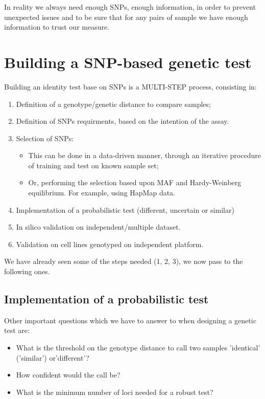 In reality we always need enough SNPs, enough information, in order to prevent unexpected issues and to be sure that for any pairs of sample we have enough information to trust our measure. 


\section{Building a SNP-based genetic test}

Building an identity test base on SNPs is a MULTI-STEP process, consisting in: 
\begin{enumerate}
	\item Definition of a genotype/genetic distance to compare samples;
	\item Definition of SNPs requirments, based on the intention of the assay.
	\item Selection of SNPs:
	\begin{itemize}
		\item This can be done in a data-driven manner, through an iterative procedure of training and test on known sample set;
		\item Or, performing the selection based upon MAF and Hardy-Weinberg equilibrium. For example, using HapMap data.
	\end{itemize}
	\item Implementation of a probabilistic test (different, uncertain or similar)
	\item In silico validation on independent/multiple dataset.
	\item Validation on cell lines genotyped on independent platform. 
\end{enumerate}
We have already seen some of the steps needed (1, 2, 3), we now pass to the following ones.


\subsection{Implementation of a probabilistic test} 

Other important questions which we have to answer to when designing a genetic test are:
\begin{itemize}
	\item What is the threshold on the genotype distance to call two samples 'identical' ('similar') or'different'?
	\item How confident would the call be?
    \item What is the minimum number of loci needed for a robust test?
\end{itemize}

